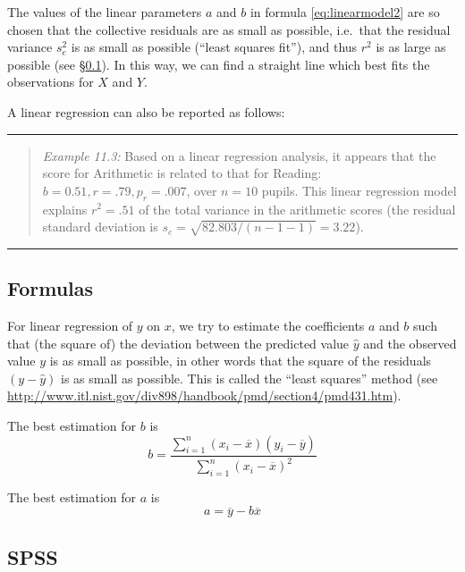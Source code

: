 \documentclass[
]{book}
\begin{document}
The values of the linear parameters \(a\) and \(b\) in
formula \eqref{eq:linearmodel2} are so chosen that the collective
residuals are as small as possible, i.e.~that the residual variance
\(s^2_e\) is as small as possible (``least squares fit''), and thus \(r^2\)
is as large as possible (see
§\ref{sec:regression-formulas}). In this way, we can find a straight line
which best fits the observations for \(X\) and \(Y\).

A linear regression can also be reported as follows:

\begin{center}\rule{0.5\linewidth}{0.5pt}\end{center}

\begin{quote}
\emph{Example 11.3:}
Based on a linear regression analysis, it appears that the score
for Arithmetic is related to that for Reading: \(b=0.51, r=.79, p_r=.007\), over \(n=10\)
pupils. This linear regression model explains \(r^2=.51\) of the
total variance in the arithmetic scores (the residual standard deviation is
\(s_e= \sqrt{82.803/(n-1-1)} = 3.22\)).
\end{quote}

\begin{center}\rule{0.5\linewidth}{0.5pt}\end{center}

\subsection{Formulas}\label{sec:regression-formulas}

For linear regression of \(y\) on \(x\), we try to estimate the coefficients \(a\)
and \(b\) such that (the square of) the deviation between the predicted value \(\hat{y}\)
and the observed value \(y\) is as small as possible, in other words that the
square of the residuals \((y-\hat{y})\) is as small as possible. This is called the
``least squares'' method (see
\url{http://www.itl.nist.gov/div898/handbook/pmd/section4/pmd431.htm}).

The best estimation for \(b\) is
\[b = \frac{ \sum_{i=1}^n (x_i-\overline{x})(y_i-\overline{y}) } { \sum_{i=1}^n (x_i-\overline{x})^2 }\]

The best estimation for \(a\) is \[a = \overline{y} - b \overline{x}\]

\subsection{SPSS}\label{spss-6}
\end{document}
